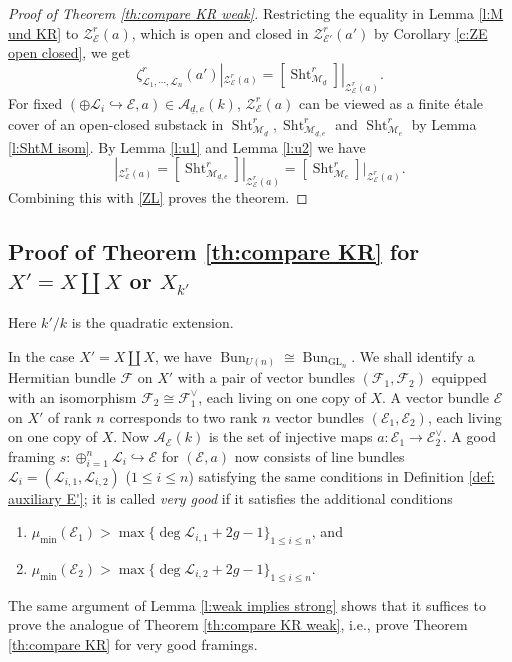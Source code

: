 \documentclass[reqno]{amsart}
\numberwithin{equation}{section}
\newcommand{\inj}{\hookrightarrow}
\DeclareMathOperator{\GL}{GL}
\DeclareMathOperator{\Bun}{Bun}
\DeclareMathOperator{\Sht}{Sht}
\newcommand\un{\underline}
\newcommand\op{\oplus}
\newcommand{\z}{\zeta}
\newcommand\cA{\mathcal{A}}
\newcommand\cE{\mathcal{E}}
\newcommand\cF{\mathcal{F}}
\newcommand\cL{\mathcal{L}}
\newcommand\cM{\mathcal{M}}
\newcommand\cZ{\mathcal{Z}}
\theoremstyle{remark}
\numberwithin{equation}{section}
\begin{document}
\begin{proof}[Proof of Theorem \ref{th:compare KR weak}] Restricting the equality in Lemma \ref{l:M und KR} to $\cZ_{\cE}^r(a)$, which is open and closed in $\cZ_{\cE'}^r(a')$ by Corollary \ref{c:ZE open closed}, we get
\begin{equation}\label{ZL}
\z^r_{\cL_{1},\cdots, \cL_{n}}(a')|_{\cZ^r_{\cE}(a)}=[\Sht^{r}_{\cM_{\un d}}]|_{\cZ_{\cE}^r(a)}.
\end{equation}
For fixed $(\op\cL_{i}\inj \cE,a)\in \cA_{\un d,e}(k)$, $\cZ^{r}_{\cE}(a)$ can be viewed as a finite \'{e}tale cover of an open-closed substack in $\Sht^{r}_{\cM_{\un d}},\Sht^{r}_{\cM_{\un d,e}}$ and $\Sht^{r}_{\cM_{e}}$ by Lemma \ref{l:ShtM isom}. By Lemma \ref{l:u1} and Lemma \ref{l:u2} we have
\begin{equation}
[\Sht^{r}_{\cM_{\un d}}]|_{\cZ^r_{\cE}(a)}=[\Sht^{r}_{\cM_{\un d,e}}]|_{\cZ^r_{\cE}(a)}=[\Sht^{r}_{\cM_{e}}]|_{\cZ^{r}_{\cE}(a)}.
\end{equation}
Combining this with \eqref{ZL} proves the theorem.
\end{proof}


\subsection{Proof of Theorem \ref{th:compare KR} for $X'=X\coprod X$ or $X_{k'}$}\label{ss:compare cycle split} Here $k'/k$ is the quadratic extension. 

In the case $X'=X\coprod X$,  we have $\Bun_{U(n)}\cong \Bun_{\GL_{n}}$. We shall identify a Hermitian bundle $\cF$ on $X'$ with a pair of vector bundles $(\cF_{1},\cF_{2})$ equipped with an isomorphism $\cF_{2}\cong \cF_{1}^{\vee}$, each living on one copy of $X$.  A vector bundle $\cE$ on $X'$ of rank $n$ corresponds to two rank $n$ vector bundles $(\cE_{1},\cE_{2})$, each living on one copy of $X$. Now $\cA_{\cE}(k)$ is the set of injective maps $a: \cE_{1}\to \cE^{\vee}_{2}$.  A good framing $s:\op_{i=1}^{n}\cL_{i}\inj \cE$ for $(\cE,a)$ now consists of line bundles $\cL_{i}=(\cL_{i,1}, \cL_{i,2})$ ($1\le i\le n$) satisfying the same conditions in Definition \ref{def: auxiliary E'}; it is called {\em very good} if it satisfies the additional conditions
\begin{enumerate}
\item[($3_{1}$)] $\mu_{\min}(\cE_{1})>\max\{\deg\cL_{i,1}+2g-1\}_{1\le i\le n}$, and
\item[($3_{2}$)] $\mu_{\min}(\cE_{2})>\max\{\deg\cL_{i,2}+2g-1\}_{1\le i\le n}$.
\end{enumerate}
The same argument of Lemma \ref{l:weak implies strong} shows that it suffices to prove the analogue of Theorem \ref{th:compare KR weak}, i.e., prove Theorem \ref{th:compare KR} for very good framings.
\end{document}
